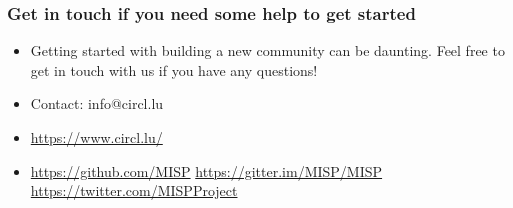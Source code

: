 \begin{frame}
	\frametitle{Get in touch if you need some help to get started}
	\begin{itemize}
		\item Getting started with building a new community can be daunting. Feel free to get in touch with us if you have any questions!
		\item Contact: info@circl.lu
		\item \url{https://www.circl.lu/}
		\item \url{https://github.com/MISP}  \url{https://gitter.im/MISP/MISP}  \url{https://twitter.com/MISPProject}
	\end{itemize}
\end{frame}
